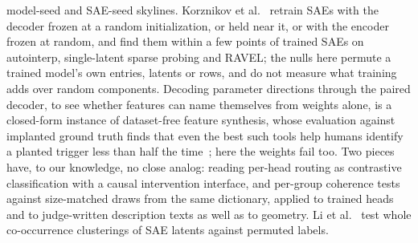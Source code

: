 model-seed and SAE-seed skylines. Korznikov et al.~\cite{korznikov2026}
retrain SAEs with the decoder frozen at a random initialization, or held
near it, or with the encoder frozen at random, and find them within a few
points of trained SAEs on autointerp, single-latent sparse probing and
RAVEL; the nulls here permute a trained model's own entries, latents or
rows, and do not measure what training adds over random components.
Decoding parameter directions through the paired decoder, to see whether
features can name themselves from weights alone, is a closed-form
instance of dataset-free feature synthesis, whose evaluation against
implanted ground truth finds that even the best such tools help humans
identify a planted trigger less than half the time~\cite{casper2023};
here the weights fail too. Two pieces have, to our knowledge, no close
analog: reading per-head routing as contrastive classification with a
causal intervention interface, and per-group coherence tests against
size-matched draws from the same dictionary, applied to trained heads and
to judge-written description texts as well as to geometry. Li et
al.~\cite{li2024geometry} test whole co-occurrence clusterings of SAE
latents against permuted labels.

